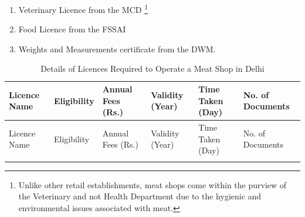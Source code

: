 \documentclass[a4paper, 12pt]{article}
\begin{document}
\begin{enumerate}
\item Veterinary Licence from the MCD \footnote{ Unlike other retail establishments, meat shops come within the purview of the Veterinary and not Health Department due to the hygienic and environmental issues associated with meat.}
\item Food Licence from the FSSAI
\item Weights and Measurements certificate from the DWM.
\end{enumerate}


\footnotesize
\begin{longtable}{>{\raggedright}p{2cm}>{\raggedright}p{3cm}>{\raggedright}p{3cm}>{\raggedright}p{2cm}>{\centering}p{1cm}>{\centering\arraybackslash}p{2cm}}
\caption{Details of Licences Required to Operate a Meat Shop in Delhi}\\
\toprule
Licence Name & Eligibility & Annual Fees (Rs.) & Validity (Year) & Time Taken (Day) & No. of Documents \\
\midrule
\endfirsthead
Licence Name & Eligibility & Annual Fees (Rs.) & Validity (Year) & Time Taken (Day) & No. of Documents \\
\toprule
\endhead
\endfoot
\hline
\endlastfoot


\end{longtable}
\end{document}
